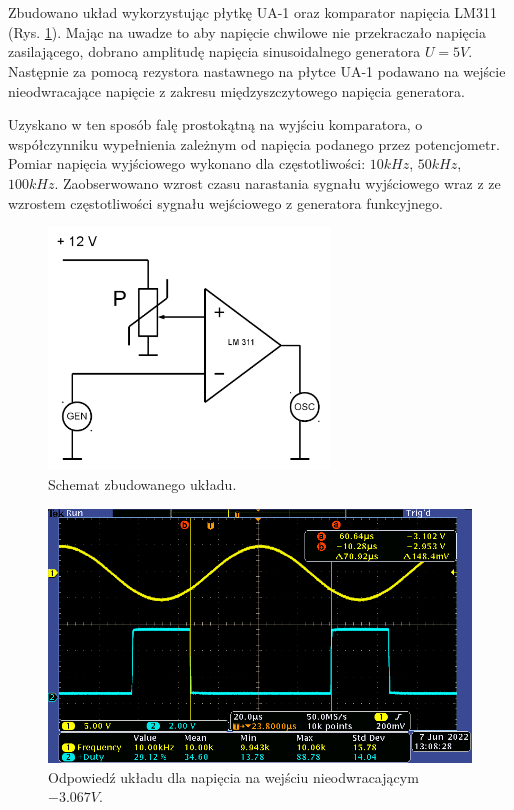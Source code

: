 \section{}

Zbudowano układ wykorzystując płytkę UA-1 oraz komparator napięcia LM311 (Rys. \ref{sh1}).
Mając na uwadze to aby napięcie chwilowe nie przekraczało napięcia zasilającego, dobrano amplitudę napięcia sinusoidalnego generatora \(U=5V\).
Następnie za pomocą rezystora nastawnego na płytce UA-1 podawano na wejście nieodwracające napięcie z zakresu międzyszczytowego napięcia generatora.

Uzyskano w ten sposób falę prostokątną na wyjściu komparatora, o współczynniku wypełnienia zależnym od napięcia podanego przez potencjometr.
Pomiar napięcia wyjściowego wykonano dla częstotliwości: \(10kHz\), \(50kHz\), \(100kHz\). Zaobserwowano wzrost czasu narastania sygnału wyjściowego wraz z ze wzrostem częstotliwości sygnału wejściowego z generatora funkcyjnego.

\begin{figure}[H]
    \centering
    \includegraphics[width=7.5cm]{include/1/1.png}
    \caption{Schemat zbudowanego układu.}
    \label{sh1}
\end{figure}

\begin{figure}[H]
    \centering
    \includegraphics[width=\textwidth]{include/1/2.png}
    \caption{Odpowiedź układu dla napięcia na wejściu nieodwracającym \(-3.067V\).}
\end{figure}

